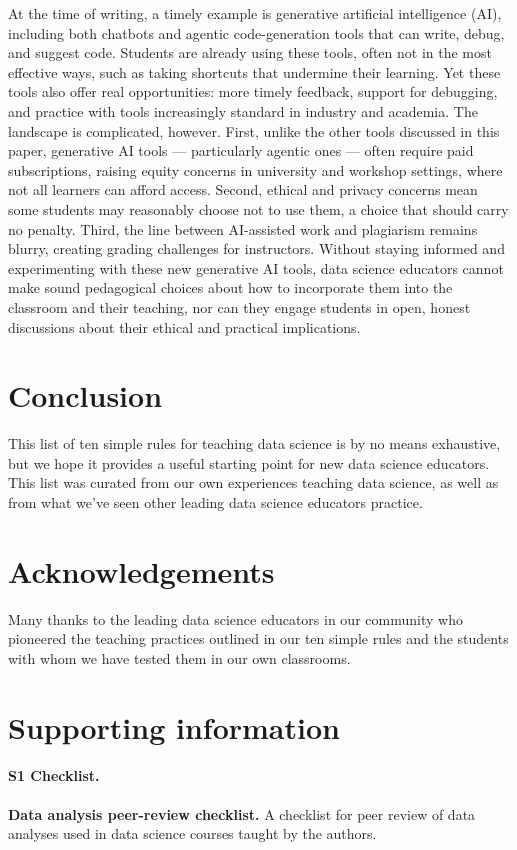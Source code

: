 \documentclass[
  10pt,
  letterpaper,
]{article}
\begin{document}
At the time of writing, a timely example is generative artificial
intelligence (AI), including both chatbots and agentic code-generation
tools that can write, debug, and suggest code. Students are already
using these tools, often not in the most effective ways, such as taking
shortcuts that undermine their learning. Yet these tools also offer real
opportunities: more timely feedback, support for debugging, and practice
with tools increasingly standard in industry and academia. The landscape
is complicated, however. First, unlike the other tools discussed in this
paper, generative AI tools --- particularly agentic ones --- often
require paid subscriptions, raising equity concerns in university and
workshop settings, where not all learners can afford access. Second,
ethical and privacy concerns mean some students may reasonably choose
not to use them, a choice that should carry no penalty. Third, the line
between AI-assisted work and plagiarism remains blurry, creating grading
challenges for instructors. Without staying informed and experimenting
with these new generative AI tools, data science educators cannot make
sound pedagogical choices about how to incorporate them into the
classroom and their teaching, nor can they engage students in open,
honest discussions about their ethical and practical implications.

\section{Conclusion}\label{sec-conclusion}

This list of ten simple rules for teaching data science is by no means
exhaustive, but we hope it provides a useful starting point for new data
science educators. This list was curated from our own experiences
teaching data science, as well as from what we've seen other leading
data science educators practice.

\section{Acknowledgements}\label{acknowledgements}

Many thanks to the leading data science educators in our community who
pioneered the teaching practices outlined in our ten simple rules and
the students with whom we have tested them in our own classrooms.


\nolinenumbers
\renewcommand\refname{References}
  

\newpage
\section*{Supporting information}

\paragraph*{S1 Checklist.}
\label{s1-checklist}
\textbf{Data analysis peer-review checklist.} A checklist for peer review of data analyses used in data science courses taught by the authors.
\end{document}
